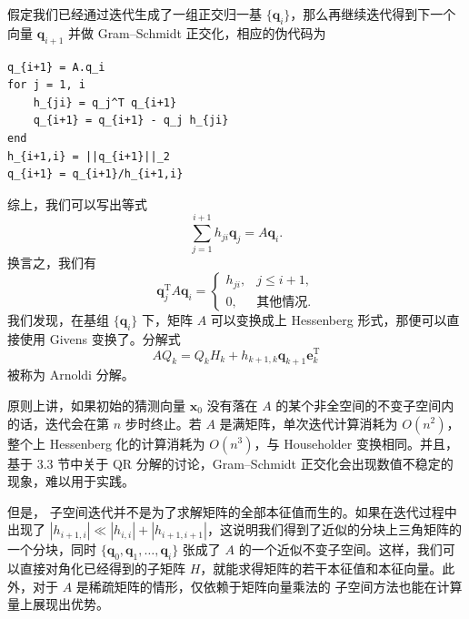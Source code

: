 假定我们已经通过迭代生成了一组正交归一基 $\{\bm q_i\}$，那么再继续迭代得到下一个向量 $\bm q_{i+1}$ 并做 Gram--Schmidt 正交化，相应的伪代码为
\begin{algorithmBox}
\begin{lstlisting}[style=bellacode]
q_{i+1} = A.q_i
for j = 1, i
    h_{ji} = q_j^T q_{i+1}
    q_{i+1} = q_{i+1} - q_j h_{ji}
end
h_{i+1,i} = ||q_{i+1}||_2
q_{i+1} = q_{i+1}/h_{i+1,i}
\end{lstlisting}
\end{algorithmBox}
综上，我们可以写出等式
\begin{equation}
\sum_{j=1}^{i+1}h_{ji}\bm q_j=A\bm q_i.
\tag{3.5.11}
\end{equation}
换言之，我们有
\begin{equation}
\bm q_j^{\mathrm T}A\bm q_i=
\begin{cases}
h_{ji},&j\le i+1,\\
0,&\text{其他情况}.
\end{cases}
\tag{3.5.12}
\end{equation}
我们发现，在基组 $\{\bm q_i\}$ 下，矩阵 $A$ 可以变换成上 Hessenberg 形式，那便可以直接使用 Givens 变换了。分解式
\begin{equation}
AQ_k=Q_kH_k+h_{k+1,k}\bm q_{k+1}\bm e_k^{\mathrm T}
\tag{3.5.13}
\end{equation}
被称为 Arnoldi 分解。

原则上讲，如果初始的猜测向量 $\bm x_0$ 没有落在 $A$ 的某个非全空间的不变子空间内的话，迭代会在第 $n$ 步时终止。若 $A$ 是满矩阵，单次迭代计算消耗为 $O(n^2)$，整个上 Hessenberg 化的计算消耗为 $O(n^3)$，与 Householder 变换相同。并且，基于 3.3 节中关于 QR 分解的讨论，Gram--Schmidt 正交化会出现数值不稳定的现象，难以用于实践。

但是， 子空间迭代并不是为了求解矩阵的全部本征值而生的。如果在迭代过程中出现了 $|h_{i+1,i}|\ll |h_{i,i}|+|h_{i+1,i+1}|$，这说明我们得到了近似的分块上三角矩阵的一个分块，同时 $\{\bm q_0,\bm q_1,\ldots,\bm q_i\}$ 张成了 $A$ 的一个近似不变子空间。这样，我们可以直接对角化已经得到的子矩阵 $H$，就能求得矩阵的若干本征值和本征向量。此外，对于 $A$ 是稀疏矩阵的情形，仅依赖于矩阵向量乘法的  子空间方法也能在计算量上展现出优势。

